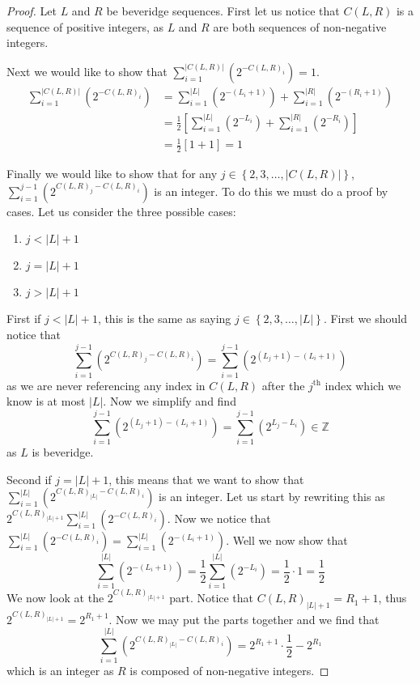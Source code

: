\documentclass{macjourn}
\def\useLim{}
\newcommand{\sumfrom}[3]{\sum\useLim_{#1}^{#2} \left( {#3} \right)}
\newcommand{\set}[1]{\left\{ {#1} \right\}}
\newcommand{\cardinality}[1]{\left| #1 \right|}
\theoremstyle{definition}
\begin{document}
	\begin{proof}
		Let $L$ and $R$ be beveridge sequences. First let us notice that $C(L,R)$ is a sequence of positive integers, as $L$ and $R$ are both sequences of non-negative integers.
		
		Next we would like to show that $\sumfrom{i=1}{\cardinality{C(L,R)}}{2^{-C(L,R)_i}}=1$.
		\begin{align*}
			\sumfrom{i=1}{\cardinality{C(L,R)}}{2^{-C(L,R)_i}}
			&= \sumfrom{i=1}{\cardinality{L}}{2^{-(L_i + 1)}} + \sumfrom{i=1}{\cardinality{R}}{2^{-(R_i+1)}} \\
			&= \frac12\left[\sumfrom{i=1}{\cardinality L}{2^{-L_i}} + \sumfrom{i=1}{\cardinality{R}}{2^{-R_i}}\right] \\
			&= \frac12\left[1 + 1\right]
			= 1
		\end{align*}
		
		Finally we would like to show that for any $j \in \set{2, 3, \ldots, \cardinality{C(L,R)}}$, $\sumfrom{i=1}{j-1}{2^{C(L,R)_j-C(L,R)_i}}$ is an integer. To do this we must do a proof by cases. Let us consider the three possible cases:
		\begin{enumerate}
			\item$j < \cardinality L + 1$
			\item$j = \cardinality L + 1$
			\item$j > \cardinality L + 1$
		\end{enumerate}
		
		First if $j < \cardinality L + 1$, this is the same as saying $j \in \set{2, 3, \ldots, \cardinality L}$.
		First we should notice that
		\[
		\sumfrom{i=1}{j-1}{2^{C(L,R)_j-C(L,R)_i}} = \sumfrom{i=1}{j-1}{2^{(L_j+1)-(L_i+1)}}
		\]
		as we are never referencing any index in $C(L,R)$ after the $j^\text{th}$ index which we know is at most $\cardinality L$. Now we simplify and find
		\[
		\sumfrom{i=1}{j-1}{2^{(L_j+1)-(L_i+1)}} = \sumfrom{i=1}{j-1}{2^{L_j-L_i}} \in \mathbb Z
		\]
		as $L$ is beveridge.
		
		Second if $j = \cardinality L + 1$, this means that we want to show that $\sumfrom{i=1}{\cardinality L}{2^{C(L,R)_{\cardinality L}-C(L,R)_i}}$ is an integer. Let us start by rewriting this as $2^{C(L,R)_{\cardinality L + 1}}\sumfrom{i=1}{\cardinality L}{2^{-C(L,R)_i}}$. Now we notice that $\sumfrom{i=1}{\cardinality L}{2^{-C(L,R)_i}} = \sumfrom{i=1}{\cardinality L}{2^{-(L_i + 1)}}$. Well we now show that
		\[\sumfrom{i=1}{\cardinality L}{2^{-(L_i + 1)}} = \frac12\sumfrom{i=1}{\cardinality L}{2^{-L_i}} = \frac12\cdot 1 = \frac12\]
		We now look at the $2^{C(L,R)_{\cardinality L + 1}}$ part. Notice that $C(L,R)_{\cardinality L + 1} = R_1 + 1$, thus $2^{C(L,R)_{\cardinality L + 1}} = 2^{R_1 + 1}$. Now we may put the parts together and we find that
		\[\sumfrom{i=1}{\cardinality L}{2^{C(L,R)_{\cardinality L}-C(L,R)_i}} = 2^{R_1 + 1}\cdot\frac12 - 2^{R_1}\]
		which is an integer as $R$ is composed of non-negative integers.
		

\end{proof}
\end{document}
